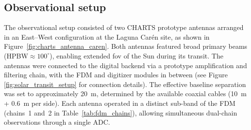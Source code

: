 \subsection{Observational setup}

The observational setup consisted of two CHARTS prototype antennas arranged in an East–West configuration at the Laguna Carén site, as shown in Figure~\ref{fig:charts_antenna_caren}. Both antennas featured broad primary beams (HPBW$\approx 100^{\circ}$), enabling extended \gls{fov} of the Sun during its transit. The antennas were connected to the digital backend via a prototype amplification and filtering chain, with the FDM and digitizer modules in between (see Figure \ref{fig:solar_transit_setup} for connection details). The effective baseline separation was set to approximately \SI{20}{\meter}, determined by the available coaxial cables (\SI{10}{\meter} + \SI{0.6}{\meter} per side). Each antenna operated in a distinct sub-band of the FDM (chains~1 and~2 in Table~\ref{tab:fdm_chains}), allowing simultaneous dual-chain observations through a single ADC.

